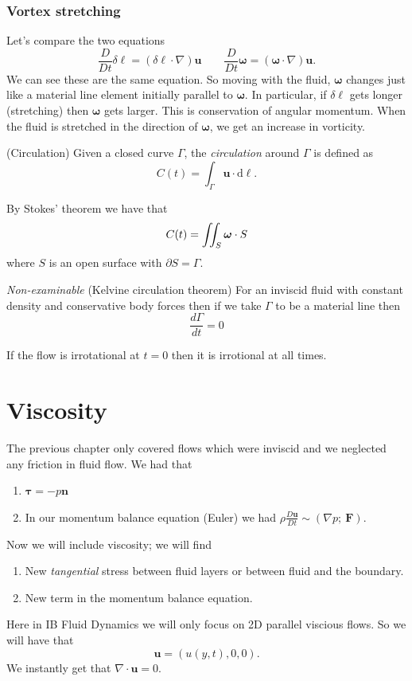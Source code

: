 \documentclass{article}
\begin{document}
\subsubsection{Vortex stretching}
Let's compare the two equations
\[
	\frac{D}{Dt}\delta\boldsymbol\ell = (\delta\boldsymbol\ell\cdot\nabla)\mathbf u\qquad \frac D{Dt}\boldsymbol\omega = (\boldsymbol\omega\cdot\nabla)\mathbf u.
\]
We can see these are the same equation. So moving with the fluid, $ \boldsymbol\omega $ changes just like a material line element initially parallel to $ \boldsymbol\omega $. In particular, if $ \delta\boldsymbol\ell $ gets longer (stretching) then $ \boldsymbol\omega $ gets larger. This is conservation of angular momentum. When the fluid is stretched in the direction of $ \boldsymbol\omega $, we get an increase in vorticity.
\begin{definition}
	(Circulation) Given a closed curve $ \Gamma $, the \textit{circulation} around $ \Gamma $ is defined as
	\[
	  C(t)=\int_\Gamma \mathbf u \cdot\mathrm d\boldsymbol\ell.
	\]
\end{definition}
By Stokes' theorem we have that
\[
  C(t) = \iint_S \boldsymbol \omega \cdot\mathrm \mathbf S
\]
where $ S $ is an open surface with $ \partial S = \Gamma $.
\begin{theorem}
	\textit{Non-examinable}	(Kelvine circulation theorem) For an inviscid fluid with constant density and conservative body forces then if we take $ \Gamma $ to be a material line then
	\[
		\frac{d\Gamma}{dt} = 0
	\]
\end{theorem}
\begin{remark}
	If the flow is irrotational at $ t=0 $ then it is irrotional at all times.
\end{remark}
\section{Viscosity}
The previous chapter only covered flows which were inviscid and we neglected any friction in fluid flow. We had that
\begin{enumerate}
	\item $ \boldsymbol\tau = -p\mathbf n $
	\item In our momentum balance equation (Euler) we had $ \rho\frac{D\mathbf u}{Dt}\sim (\nabla p;\ \mathbf F) $.
\end{enumerate}
Now we will include viscosity; we will find
\begin{enumerate}
	\item New \textit{tangential} stress between fluid layers or between fluid and the boundary.
	\item New term in the momentum balance equation.
\end{enumerate}
Here in IB Fluid Dynamics we will only focus on 2D parallel viscious flows. So we will have that
\[
  \mathbf u = (u(y,t),0,0).
\]
We instantly get that $ \nabla\cdot\mathbf u = 0 $.
\end{document}

